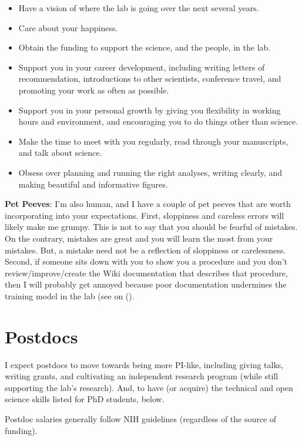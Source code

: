 \documentclass[letterpaper,11pt,oneside]{memoir}
\begin{document}
\begin{itemize}
\item Have a vision of where the lab is going over the next several years.
\item Care about your happiness.
\item Obtain the funding to support the science, and the people, in the lab.
\item Support you in your career development, including writing letters of recommendation, introductions to other scientists, conference travel, and promoting your work as often as possible.
\item Support you in your personal growth by giving you flexibility in working hours and environment, and encouraging you to do things other than science.
\item Make the time to meet with you regularly, read through your manuscripts, and talk about science.
\item Obsess over planning and running the right analyses, writing clearly, and making beautiful and informative figures.
\end{itemize}

\noindent \textbf{Pet Peeves}: I'm also human, and I have a couple of pet peeves that are worth incorporating into your expectations. First, sloppiness and careless errors will likely make me grumpy. This is not to say that you should be fearful of mistakes. On the contrary, mistakes are great and you will learn the most from your mistakes. But, a mistake need not be a reflection of sloppiness or carelessness. Second, if someone sits down with you to show you a procedure and you don't review/improve/create the Wiki documentation that describes that procedure, then I will probably get annoyed because poor documentation undermines the training model in the lab (see  on ().

\section{Postdocs}

I expect postdocs to move towards being more PI-like, including giving talks, writing grants, and cultivating an independent research program (while still supporting the lab's research). And, to have (or acquire) the technical and open science skills listed for PhD students, below.

Postdoc salaries generally follow NIH guidelines (regardless of the source of funding).
\end{document}

